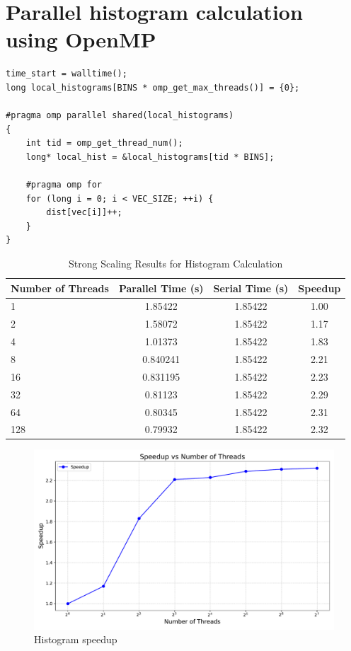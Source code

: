 \documentclass[unicode,11pt,a4paper,oneside,numbers=endperiod,openany]{scrartcl}
\begin{document}
\section{Parallel histogram calculation using OpenMP }
\begin{lstlisting}[language=MyC++, style=mystyle, caption={Parallel Histogram Calculation with OpenMP}]
time_start = walltime();
long local_histograms[BINS * omp_get_max_threads()] = {0};

#pragma omp parallel shared(local_histograms)
{
    int tid = omp_get_thread_num();
    long* local_hist = &local_histograms[tid * BINS];

    #pragma omp for
    for (long i = 0; i < VEC_SIZE; ++i) {
        dist[vec[i]]++;
    }
}
\end{lstlisting}
\begin{table}[h]
    \centering
    \caption{Strong Scaling Results for Histogram Calculation}
    \begin{tabular}{lccc}
        \toprule
        \textbf{Number of Threads} & \textbf{Parallel Time (s)} & \textbf{Serial Time (s)} & \textbf{Speedup} \\ \midrule
        1   & 1.85422   & 1.85422   & 1.00 \\ 
        2   & 1.58072   & 1.85422   & 1.17 \\ 
        4   & 1.01373   & 1.85422   & 1.83 \\ 
        8   & 0.840241  & 1.85422   & 2.21 \\ 
        16  & 0.831195  & 1.85422   & 2.23 \\ 
        32  & 0.81123   & 1.85422   & 2.29 \\ 
        64  & 0.80345   & 1.85422   & 2.31 \\ 
        128 & 0.79932   & 1.85422   & 2.32 \\ \bottomrule
    \end{tabular}
    \label{tab:strong_scaling}
\end{table}
\begin{figure}[h]
    \centering
    \includegraphics[width=1\textwidth]{pictures/histogram_speedup_plot.pdf}
    \caption{Histogram speedup}
\end{figure}
\end{document}
